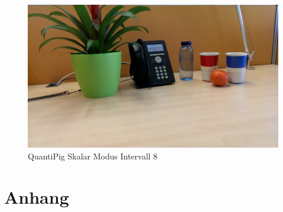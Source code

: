 \begin{landscape}
\begin{figure}[h]
	\centering
		\includegraphics[width=1.4\textwidth]{img/Fotos/QuantiPig_Skalar_8.png}
	\caption[QuantiPig Skalar Modus Intervall 8]{QuantiPig Skalar Modus Intervall 8}
	\label{fig:pig_skal8}
\end{figure}



\end{landscape}


\clearpage


\section{Anhang}

